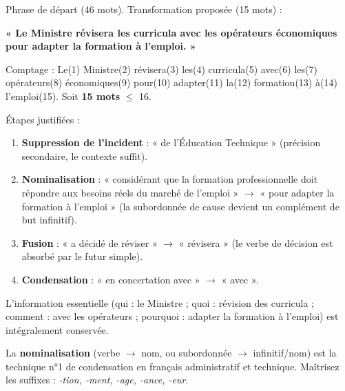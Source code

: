 \documentclass[11pt]{article}
\begin{document}
\begin{corrige}
Phrase de départ (46 mots). Transformation proposée (15 mots) :

\begin{center}
\textbf{« Le Ministre révisera les curricula avec les opérateurs économiques pour adapter la formation à l'emploi. »}
\end{center}

Comptage : Le(1) Ministre(2) révisera(3) les(4) curricula(5) avec(6) les(7) opérateurs(8) économiques(9) pour(10) adapter(11) la(12) formation(13) à(14) l'emploi(15). Soit \textbf{15 mots} $\leq$ 16.

Étapes justifiées :
\begin{enumerate}
    \item \textbf{Suppression de l'incident} : « de l'Éducation Technique » (précision secondaire, le contexte suffit).
    \item \textbf{Nominalisation} : « considérant que la formation professionnelle doit répondre aux besoins réels du marché de l'emploi » $\rightarrow$ « pour adapter la formation à l'emploi » (la subordonnée de cause devient un complément de but infinitif).
    \item \textbf{Fusion} : « a décidé de réviser » $\rightarrow$ « révisera » (le verbe de décision est absorbé par le futur simple).
    \item \textbf{Condensation} : « en concertation avec » $\rightarrow$ « avec ».
\end{enumerate}
L'information essentielle (qui : le Ministre ; quoi : révision des curricula ; comment : avec les opérateurs ; pourquoi : adapter la formation à l'emploi) est intégralement conservée.
\end{corrige}

\begin{attention}
La \textbf{nominalisation} (verbe $\rightarrow$ nom, ou subordonnée $\rightarrow$ infinitif/nom) est la technique n°1 de condensation en français administratif et technique. Maîtrisez les suffixes : \emph{-tion, -ment, -age, -ance, -eur}.
\end{attention}
\end{document}
